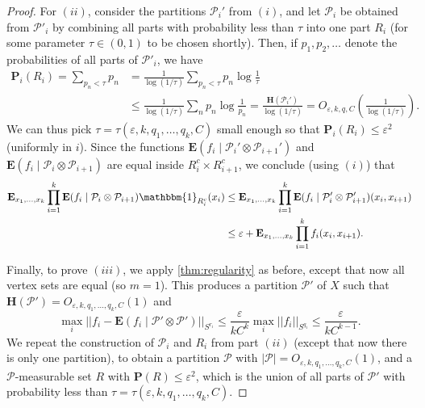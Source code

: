 \documentclass[reqno,11pt]{amsart}
\theoremstyle{definition}
\theoremstyle{remark}
\numberwithin{equation}{section}
\renewcommand{\P}{\mathbf{P}}
\renewcommand{\H}{\mathbf{H}}
\newcommand{\E}{\mathbf{E}}
\newcommand{\mP}{\mathcal{P}}
\newcommand{\one}{\mathbbm{1}}
\newcommand{\eps}{\varepsilon}
\begin{document}
\begin{proof}
For $(ii)$, consider the partitions $\mP_i'$ from $(i)$, and let $\mP_i$ be obtained from $\mP'_i$ by combining all parts with probability less than $\tau$ into one part $R_i$ (for some parameter $\tau \in (0, 1)$ to be chosen shortly). Then, if $p_1, p_2, \ldots$ denote the probabilities of all parts of $\mP'_i$, we have 
\begin{equation} \label{eq:entropy-bound}
\begin{aligned}
    \P_i(R_i) = \sum_{p_n < \tau} p_n 
    &=
    \frac{1}{\log (1/\tau)} \sum_{p_n < \tau} p_n \log \frac{1}{\tau}
    \\
    &\le 
    \frac{1}{\log (1/\tau)} \sum_{n} p_n \log \frac{1}{p_n}
    =
    \frac{\H(\mP_i')}{\log(1/\tau)} = O_{\eps,k,q,C}\left(\frac{1}{\log(1/\tau)} \right).
\end{aligned}
\end{equation}
We can thus pick $\tau = \tau(\eps,k,q_1, \ldots, q_k,C)$ small enough so that $\P_i(R_{i}) \le \eps^2$ (uniformly in $i$). Since the functions $\E(f_{i} \mid \mP_i' \otimes \mP_{i+1}')$ and $\E(f_{i} \mid \mP_i \otimes \mP_{i+1})$ are equal inside $R_i^c \times R_{i+1}^c$, we conclude (using $(i)$) that
\[
\begin{aligned}
    \E_{x_1, \ldots, x_k} \prod_{i=1}^k \E(f_{i} \mid \mP_i \otimes \mP_{i+1})\one_{R_{i}^c}(x_i) 
    &\le
    \E_{x_1, \ldots, x_k} \prod_{i=1}^k \E(f_{i} \mid \mP_i' \otimes \mP_{i+1}')(x_i,x_{i+1}) 
    \\
    &\le \eps + \E_{x_1, \ldots, x_k} \prod_{i=1}^k f_{i}(x_i,x_{i+1}).
\end{aligned}
\]

Finally, to prove $(iii)$, we apply \cref{thm:regularity} as before, except that now all vertex sets are equal (so $m = 1$). This produces a partition $\mP'$ of $X$ such that $\H(\mP') = O_{\eps,k,q_1, \ldots, q_k,C}(1)$ and
\[
    \max_i ||f_{i} - \E(f_{i} \mid \mP' \otimes \mP')||_{S^{r_i}} \le \frac{\eps}{kC^k} \max_i ||f_{i}||_{S^{q_i}} \le \frac{\eps}{kC^{k-1}}.
\]
We repeat the construction of $\mP_i$ and $R_i$ from part $(ii)$ (except that now there is only one partition), to obtain a partition $\mP$ with $|\mP| = O_{\eps,k,q_1, \ldots, q_k,C}(1)$, and a $\mP$-measurable set $R$ with $\P(R) \le \eps^2$, which is the union of all parts of $\mP'$ with probability less than $\tau = \tau(\eps,k,q_1,\ldots,q_k,C)$.


\end{proof}
\end{document}
